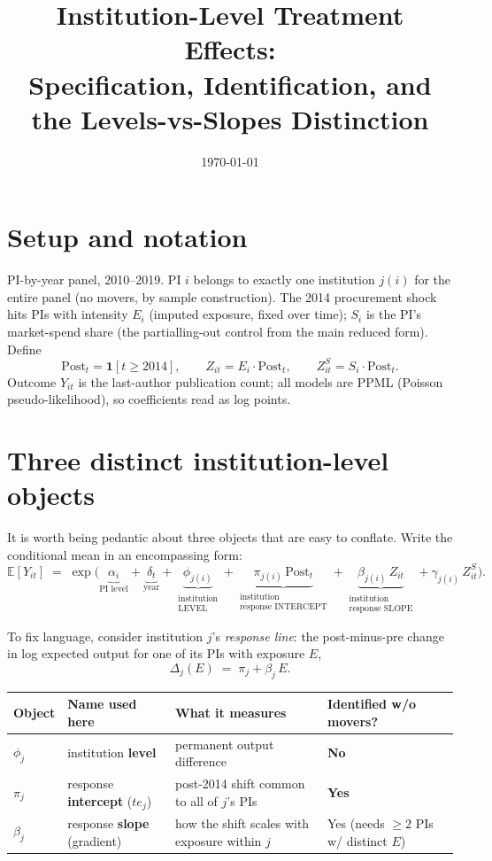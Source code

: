 \documentclass[11pt]{article}
\title{Institution-Level Treatment Effects:\\ Specification, Identification, and the Levels-vs-Slopes Distinction}
\author{}
\date{\today}
\newcommand{\E}{\mathbb{E}}
\newcommand{\Post}{\mathrm{Post}}
\begin{document}
\maketitle

\section{Setup and notation}

PI-by-year panel, 2010--2019. PI $i$ belongs to exactly one institution
$j(i)$ for the entire panel (no movers, by sample construction). The 2014
procurement shock hits PIs with intensity $E_i$ (imputed exposure, fixed over
time); $S_i$ is the PI's market-spend share (the partialling-out control from
the main reduced form). Define
\[
\Post_t = \mathbf{1}[t \ge 2014], \qquad
Z_{it} = E_i \cdot \Post_t, \qquad
Z^{S}_{it} = S_i \cdot \Post_t .
\]
Outcome $Y_{it}$ is the last-author publication count; all models are PPML
(Poisson pseudo-likelihood), so coefficients read as log points.

\section{Three distinct institution-level objects}

It is worth being pedantic about three objects that are easy to conflate.
Write the conditional mean in an encompassing form:
\begin{equation}
\E[Y_{it}] \;=\; \exp\Big(
\underbrace{\alpha_i}_{\text{PI level}}
+ \underbrace{\delta_t}_{\text{year}}
+ \underbrace{\phi_{j(i)}}_{\substack{\text{institution}\\ \text{LEVEL}}}
+ \underbrace{\pi_{j(i)}\,\Post_t}_{\substack{\text{institution}\\ \text{response INTERCEPT}}}
+ \underbrace{\beta_{j(i)}\, Z_{it}}_{\substack{\text{institution}\\ \text{response SLOPE}}}
+ \gamma_{j(i)}\, Z^{S}_{it}
\Big).
\label{eq:encompassing}
\end{equation}

To fix language, consider institution $j$'s \emph{response line}: the
post-minus-pre change in log expected output for one of its PIs with exposure
$E$,
\begin{equation}
\Delta_j(E) \;=\; \pi_j + \beta_j \, E .
\label{eq:responseline}
\end{equation}

\begin{center}
\begin{tabular}{@{}llll@{}}
\toprule
Object & Name used here & What it measures & Identified w/o movers? \\
\midrule
$\phi_j$ & institution \textbf{level} & permanent output difference & \textbf{No} \\
$\pi_j$ & response \textbf{intercept} ($te_j$) & post-2014 shift common to all of $j$'s PIs & \textbf{Yes} \\
$\beta_j$ & response \textbf{slope} (gradient) & how the shift scales with exposure within $j$ & Yes (needs $\ge 2$ PIs w/ distinct $E$) \\
\bottomrule
\end{tabular}
\end{center}
\end{document}
